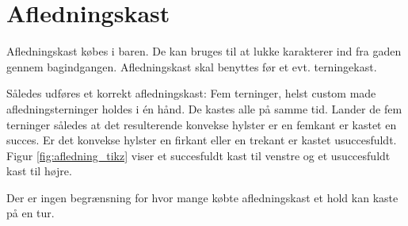 \section{Afledningskast}
Afledningskast købes i baren. De kan bruges til at lukke karakterer ind fra gaden gennem bagindgangen. Afledningskast skal benyttes før et evt. terningekast.

Således udføres et korrekt afledningskast: Fem terninger, helst custom made afledningsterninger holdes i én hånd. De kastes alle på samme tid. Lander de fem terninger således at det resulterende konvekse hylster er en femkant er kastet en succes. Er det konvekse hylster en firkant eller en trekant er kastet usuccesfuldt. Figur \ref{fig:afledning_tikz} viser et succesfuldt kast til venstre og et usuccesfuldt kast til højre.

\begin{Figure}
\centering

\label{fig:afledning_tikz}
\end{Figure}

Der er ingen begrænsning for hvor mange købte afledningskast et hold kan kaste på en tur.

